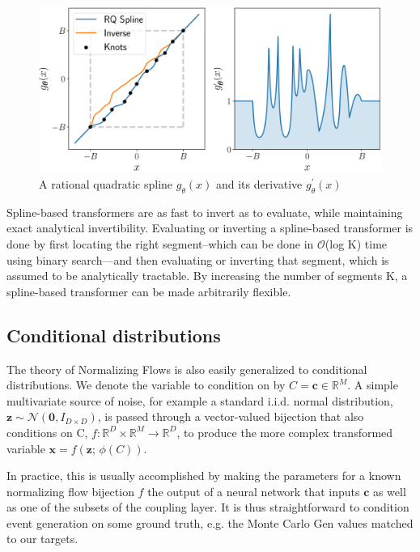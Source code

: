 \begin{figure}
    \centering
    \includegraphics[width=\columnwidth]{gfx/ch4/D9F0PDyWsAAWKHf.png}
    \caption[Rational quadratic spline]{A rational quadratic spline $g_{\theta}(x)$ and its derivative $g_{\theta}^{'}(x)$}
    \label{fig:rqs}
\end{figure}

Spline-based transformers are as fast to invert as to evaluate, while
maintaining exact analytical invertibility. Evaluating or inverting a spline-based transformer
is done by first locating the right segment--which can be done in $\mathcal{O}$(log K) time using binary
search—and then evaluating or inverting that segment, which is assumed to be analytically
tractable. By increasing the number of segments K, a spline-based transformer can be
made arbitrarily flexible.

\subsection{Conditional distributions}

The theory of Normalizing Flows is also easily generalized to conditional distributions. We denote the variable to condition on by $C=\mathbf{c}\in\mathbb{R}^M$. A simple multivariate source of noise, for example a standard i.i.d. normal distribution, $\mathbf{z}\sim\mathcal{N}(\mathbf{0},I_{D\times D})$, is passed through a vector-valued bijection that also conditions on C, $f:\mathbb{R}^D\times\mathbb{R}^M\rightarrow\mathbb{R}^D$, to produce the more complex transformed variable $\mathbf{x}=f(\mathbf{z};\, \phi(C))$. 

In practice, this is usually accomplished by making the parameters for a known normalizing flow bijection $f$ the output of a neural network that inputs $\mathbf{c}$ as well as one of the subsets of the coupling layer. It is thus straightforward to condition event generation on some ground truth, e.g. the Monte Carlo Gen values matched to our targets.


